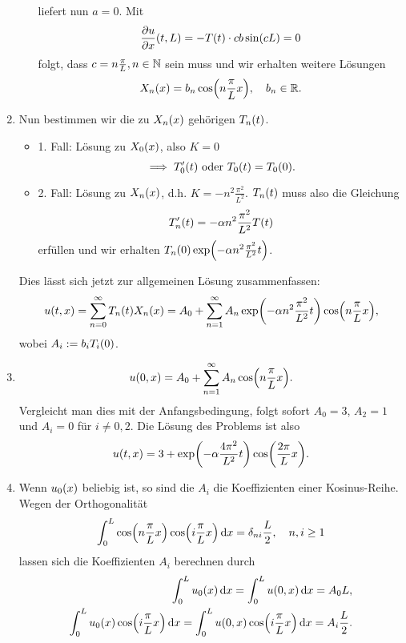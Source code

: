 \documentclass{exercise}
\begin{document}
\begin{enumerate}
\begin{itemize}
\[            \]
            liefert nun \(a = 0\).
            Mit
            \[
                \frac{\partial u}{\partial x}\parentheses*{t, L} = -T\parentheses*{t} \cdot cb\sin\parentheses*{cL} = 0
            \]
            folgt, dass \(c = n\frac{\pi}{L}, n \in \mathbb{N}\) sein muss und wir erhalten weitere Lösungen
            \[
                X_n\parentheses*{x} = b_n \cos\parentheses*{n\frac{\pi}{L}x}, \quad b_n \in \R.
            \]
        \end{itemize}
        \item Nun bestimmen wir die zu \(X_n\parentheses*{x}\) gehörigen \(T_n\parentheses*{t}\).
        \begin{itemize}
            \item 1. Fall: Lösung zu \(X_0\parentheses*{x}\), also \(K = 0\)
            \[
                \implies T_0'\parentheses*{t}\text{ oder }T_0\parentheses*{t} = T_0\parentheses*{0}.
            \]
            \item 2. Fall: Lösung zu \(X_n\parentheses*{x}\), d.h. \(K = -n^2 \frac{\pi^2}{L^2}\).
            \(T_n\parentheses*{t}\) muss also die Gleichung
            \[
                T_n'\parentheses*{t} = -\alpha n^2 \frac{\pi^2}{L^2}T\parentheses*{t}
            \]
            erfüllen und wir erhalten \(T_n\parentheses*{0}\exp\parentheses*{-\alpha n^2 \frac{\pi^2}{L^2}t}\).
        \end{itemize}
        Dies lässt sich jetzt zur allgemeinen Lösung zusammenfassen:
        \[
            u\parentheses*{t, x} = \sum_{n = 0}^\infty T_n\parentheses*{t}X_n\parentheses*{x} = A_0 + \sum_{n = 1}^\infty A_n \exp\parentheses*{-\alpha n^2 \frac{\pi^2}{L^2}t}\cos\parentheses*{n\frac{\pi}{L}x},
        \]
        wobei \(A_i := b_i T_i\parentheses*{0}\).
        \item
        \[
            u\parentheses*{0, x} = A_0 + \sum_{n = 1}^\infty A_n \cos\parentheses*{n\frac{\pi}{L}x}.
        \]
        Vergleicht man dies mit der Anfangsbedingung, folgt sofort \(A_0 = 3\), \(A_2 = 1\) und \(A_i = 0\) für \(i \ne 0, 2\).
        Die Lösung des Problems ist also
        \[
            u\parentheses*{t, x} = 3 + \exp\parentheses*{-\alpha\frac{4\pi^2}{L^2}t}\cos\parentheses*{\frac{2\pi}{L}x}.
        \]
        \item Wenn \(u_0\parentheses*{x}\) beliebig ist, so sind die \(A_i\) die Koeffizienten einer Kosinus-Reihe.
        Wegen der Orthogonalität
        \[
            \int_0^L \cos\parentheses*{n\frac{\pi}{L}x}\cos\parentheses*{i\frac{\pi}{L}x}\d x = \delta_{ni}\frac{L}{2}, \quad n, i \ge 1
        \]
        lassen sich die Koeffizienten \(A_i\) berechnen durch
        \begin{align*}
            \int_0^L u_0\parentheses*{x}\d x = \int_0^L u\parentheses*{0, x}\d x = A_0 L,\\
            \int_0^L u_0\parentheses*{x}\cos\parentheses*{i\frac{\pi}{L}x}\d x = \int_0^L u\parentheses*{0, x}\cos\parentheses*{i\frac{\pi}{L}x}\d x = A_i\frac{L}{2}.
        \end{align*}
    \end{enumerate}
\end{document}
